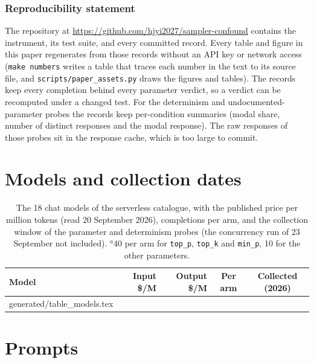 \documentclass[10pt]{article}
\makeatletter
\newcommand{\p}[1]{\texttt{#1}}
\newcommand{\inputrows}[1]{\@@input #1 }
\makeatother
\begin{document}
\subsubsection*{Reproducibility statement}

The repository at \url{https://github.com/hjyi2027/sampler-confound} contains the instrument, its test suite, and every committed record. Every table and figure in this paper regenerates from those records without an API key or network access (\texttt{make numbers} writes a table that traces each number in the text to its source file, and \texttt{scripts/paper\_assets.py} draws the figures and tables). The records keep every completion behind every parameter verdict, so a verdict can be recomputed under a changed test. For the determinism and undocumented-parameter probes the records keep per-condition summaries (modal share, number of distinct responses and the modal response). The raw responses of those probes sit in the response cache, which is too large to commit.




\appendix
\raggedbottom

\section{Models and collection dates}
\label{app:models}

\begin{table}[H]
\centering
\small
\caption{The 18 chat models of the serverless catalogue, with the published price per million tokens (read 20 September 2026), completions per arm, and the collection window of the parameter and determinism probes (the concurrency run of 23 September not included). $^{a}$40 per arm for \p{top\_p}, \p{top\_k} and \p{min\_p}, 10 for the other parameters.}
\label{tab:models}
\begin{tabular}{lrrcc}
\toprule
Model & Input \$/M & Output \$/M & Per arm & Collected (2026) \\
\midrule
\inputrows{generated/table_models.tex}
\bottomrule
\end{tabular}
\end{table}

\section{Prompts}
\label{app:prompts}
\end{document}
